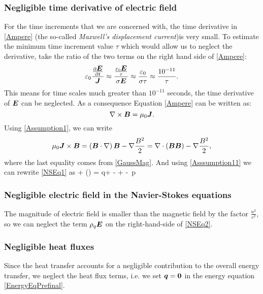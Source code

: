 \subsubsection{Negligible time derivative of electric field}
For the time increments that we are concerned with, the time derivative in \ref{Ampere} (the so-called \textit{Maxwell's displacement current})is
very small. To estimate the minimum time increment value $\tau$ which would allow us to neglect the derivative, take the ratio of the two terms on the right hand side of \ref{Ampere}:
\begin{equation}
\varepsilon_0 \frac{\frac{\partial{\mbox{\boldmath $E$}}}{\partial{t}}}{\mbox{\boldmath $J$}} \approx \frac{\frac{\varepsilon_0 \mbox{\boldmath $E$}}{\tau}}{\sigma\mbox{\boldmath $E$}} \approx \frac{\varepsilon_0}{\sigma \tau} \approx \frac{10^{-11}}{\tau}.
\end{equation}
This means for time scales much greater than $10^{-11}$ seconds, the time derivative of $\mbox{\boldmath $E$}$ can be neglected. As a consequence Equation \ref{Ampere} can be written as:
\begin{equation}
\label{Assumption1} \nabla \times \mbox{\boldmath $B$} = \mu_0 \mbox{\boldmath $J$}.
\end{equation}
Using \ref{Assumption1}, we can write
\begin{equation}
\label{Asssumption11} \mu_0 \mbox{\boldmath $J$} \times \mbox{\boldmath $B$} = \left(\mbox{\boldmath $B$}\cdot\nabla\right)\mbox{\boldmath $B$} - \nabla\frac{B^2}{2} = \nabla\cdot\left(\mbox{\boldmath $B$}\mbox{\boldmath $B$}\right) - \nabla\frac{B^2}{2},
\end{equation}
where the last equality comes from \ref{GaussMag}. And using \ref{Asssumption11} we can rewrite \ref{NSEq1} as
\be
\label{NSEq2}  + \nabla\cdot\left(\bfpi\otimes\bfu\right) =  q\bfE + \nabla\cdot\lo{}\bfB\bfB - \ro + \rho\bfg - \nabla\,p
\ee

\subsubsection{Negligible electric field in the Navier-Stokes equations}
The magnitude of electric field is smaller than the magnetic field by the factor $\frac{u^2}{c^2}$, so we can neglect the term $\rho_q\mbox{\boldmath $E$}$ on the right-hand-side of \ref{NSEq2}.

\subsubsection{Negligible heat fluxes}
Since the heat transfer accounts for a negligible contribution to the overall energy transfer, we neglect the heat flux terms, i.e. we set $\mbox{\boldmath $q$} = \mathbf{0}$ in the energy equation \ref{EnergyEqPrefinal}.

